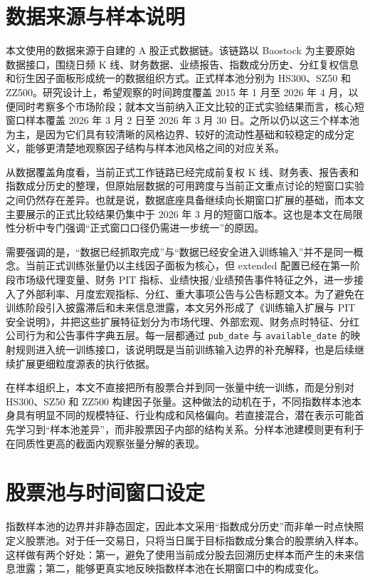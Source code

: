 \section{数据来源与样本说明}

本文使用的数据来源于自建的 A 股正式数据链。该链路以 Baostock 为主要原始数据接口，围绕日频 K 线、财务数据、业绩报告、指数成分历史、分红复权信息和衍生因子面板形成统一的数据组织方式。正式样本池分别为 HS300、SZ50 和 ZZ500。研究设计上，希望观察的时间跨度覆盖 2015 年 1 月至 2026 年 4 月，以便同时考察多个市场阶段；就本文当前纳入正文比较的正式实验结果而言，核心短窗口样本覆盖 2026 年 3 月 2 日至 2026 年 3 月 30 日。之所以仍以这三个样本池为主，是因为它们具有较清晰的风格边界、较好的流动性基础和较稳定的成分定义，能够更清楚地观察因子结构与样本池风格之间的对应关系。

从数据覆盖角度看，当前正式工作链路已经完成前复权 K 线、财务表、报告表和指数成分历史的整理，但原始层数据的可用跨度与当前正文重点讨论的短窗口实验之间仍然存在差异。也就是说，数据底座具备继续向长期窗口扩展的基础，而本文主要展示的正式比较结果仍集中于 2026 年 3 月的短窗口版本。这也是本文在局限性分析中专门强调“正式窗口口径仍需进一步统一”的原因。

需要强调的是，“数据已经抓取完成”与“数据已经安全进入训练输入”并不是同一概念。当前正式训练张量仍以主线因子面板为核心，但 extended 配置已经在第一阶段市场级代理变量、财务 PIT 指标、业绩快报/业绩预告事件特征之外，进一步接入了外部利率、月度宏观指标、分红、重大事项公告与公告标题文本。为了避免在训练阶段引入披露滞后和未来信息泄露，本文另外形成了《训练输入扩展与 PIT 安全说明》，并把这些扩展特征划分为市场代理、外部宏观、财务点时特征、分红公司行为和公告事件字典五层。每一层都通过 \texttt{pub\_date} 与 \texttt{available\_date} 的映射规则进入统一训练接口，该说明既是当前训练输入边界的补充解释，也是后续继续扩展更细粒度源表的执行依据。

在样本组织上，本文不直接把所有股票合并到同一张量中统一训练，而是分别对 HS300、SZ50 和 ZZ500 构建因子张量。这种做法的动机在于，不同指数样本池本身具有明显不同的规模特征、行业构成和风格偏向。若直接混合，潜在表示可能首先学习到“样本池差异”，而非股票因子内部的结构关系。分样本池建模则更有利于在同质性更高的截面内观察张量分解的表现。

\section{股票池与时间窗口设定}

指数样本池的边界并非静态固定，因此本文采用“指数成分历史”而非单一时点快照定义股票池。对于任一交易日，只将当日属于目标指数成分集合的股票纳入样本。这样做有两个好处：第一，避免了使用当前成分股去回溯历史样本而产生的未来信息泄露；第二，能够更真实地反映指数样本池在长期窗口中的构成变化。

